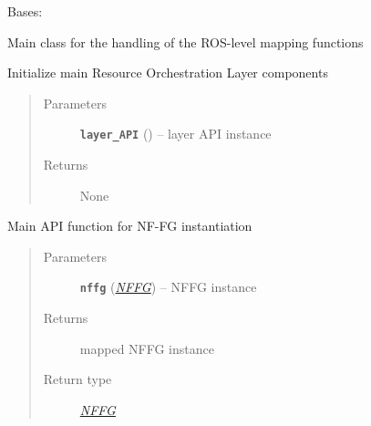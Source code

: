 \documentclass[letterpaper,10pt,english]{sphinxmanual}
\begin{document}
\begin{fulllineitems}
\label{orchest/ros_orchestration:escape.orchest.ros_orchestration.ResourceOrchestrator}
Bases: \href{https://docs.python.org/2.7/library/functions.html\#object}{}

Main class for the handling of the ROS-level mapping functions

\begin{fulllineitems}
\label{orchest/ros_orchestration:escape.orchest.ros_orchestration.ResourceOrchestrator.__init__}
Initialize main Resource Orchestration Layer components
\begin{quote}\begin{description}
\item[{Parameters}] \leavevmode
\textbf{\texttt{layer\_API}} ({\hyperref[orchest/ros_API:escape.orchest.ros_API.ResourceOrchestrationAPI]{\emph{}}}) -- layer API instance

\item[{Returns}] \leavevmode
None

\end{description}\end{quote}

\end{fulllineitems}


\begin{fulllineitems}
\label{orchest/ros_orchestration:escape.orchest.ros_orchestration.ResourceOrchestrator.instantiate_nffg}
Main API function for NF-FG instantiation
\begin{quote}\begin{description}
\item[{Parameters}] \leavevmode
\textbf{\texttt{nffg}} ({\hyperref[util/nffg:escape.util.nffg.NFFG]{\emph{\emph{NFFG}}}}) -- NFFG instance

\item[{Returns}] \leavevmode
mapped NFFG instance

\item[{Return type}] \leavevmode
{\hyperref[util/nffg:escape.util.nffg.NFFG]{\emph{NFFG}}}

\end{description}\end{quote}

\end{fulllineitems}


\end{fulllineitems}
\end{document}
